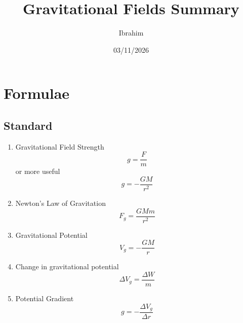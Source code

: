 \documentclass[11pt,a4paper]{article}
\title{Gravitational Fields Summary}
\author{Ibrahim}
\date{03/11/2026}
\begin{document}
\maketitle

\section{Formulae}
\subsection{Standard}
\begin{enumerate}

    \item Gravitational Field Strength
    \begin{equation}
        g = \frac{F}{m}
    \end{equation}
    or more useful
    \begin{equation}
        g = -\frac{GM}{r^2}
    \end{equation}
    
    \item Newton's Law of Gravitation
    \begin{equation}
        F_g = \frac{GMm}{r^2}
    \end{equation}

    \item Gravitational Potential
    \begin{equation}
        V_g = -\frac{GM}{r}
    \end{equation}

    \item Change in gravitational potential
    \begin{equation}
        \Delta V_g = \frac{\Delta W}{m}
    \end{equation}

    \item Potential Gradient
    \begin{equation}
        g = -\frac{\Delta V_g}{\Delta r}
    \end{equation}
\end{enumerate}
\clearpage
\end{document}
